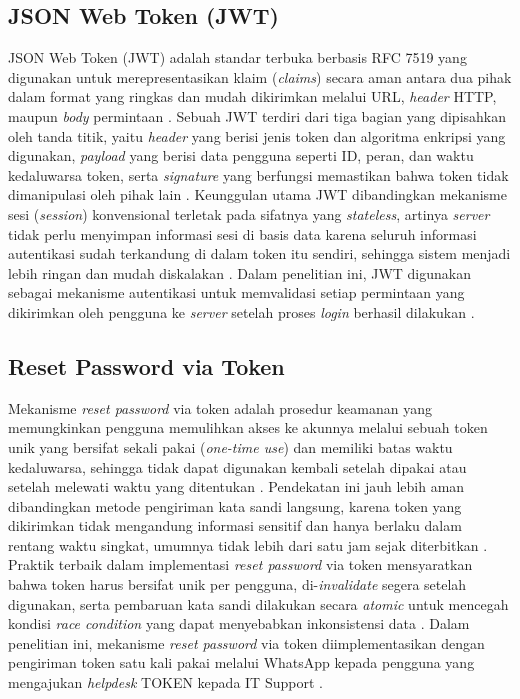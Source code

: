 \subsection{JSON Web Token (JWT)} \label{II.JWT}
JSON Web Token (JWT) adalah standar terbuka berbasis RFC 7519 yang digunakan untuk merepresentasikan klaim (\textit{claims}) secara aman antara dua pihak dalam format yang ringkas dan mudah dikirimkan melalui URL, \textit{header} HTTP, maupun \textit{body} permintaan \cite{jones2015rfc7519}. Sebuah JWT terdiri dari tiga bagian yang dipisahkan oleh tanda titik, yaitu \textit{header} yang berisi jenis token dan algoritma enkripsi yang digunakan, \textit{payload} yang berisi data pengguna seperti ID, peran, dan waktu kedaluwarsa token, serta \textit{signature} yang berfungsi memastikan bahwa token tidak dimanipulasi oleh pihak lain \cite{jones2015rfc7519}. Keunggulan utama JWT dibandingkan mekanisme sesi (\textit{session}) konvensional terletak pada sifatnya yang \textit{stateless}, artinya \textit{server} tidak perlu menyimpan informasi sesi di basis data karena seluruh informasi autentikasi sudah terkandung di dalam token itu sendiri, sehingga sistem menjadi lebih ringan dan mudah diskalakan \cite{miftahul2024jwt}. Dalam penelitian ini, JWT digunakan sebagai mekanisme autentikasi untuk memvalidasi setiap permintaan yang dikirimkan oleh pengguna ke \textit{server} setelah proses \textit{login} berhasil dilakukan \cite{miftahul2024jwt}. \par

\subsection{Reset Password via Token} \label{II.ResetPassword}
Mekanisme \textit{reset password} via token adalah prosedur keamanan yang memungkinkan pengguna memulihkan akses ke akunnya melalui sebuah token unik yang bersifat sekali pakai (\textit{one-time use}) dan memiliki batas waktu kedaluwarsa, sehingga tidak dapat digunakan kembali setelah dipakai atau setelah melewati waktu yang ditentukan \cite{vaadata2024reset}. Pendekatan ini jauh lebih aman dibandingkan metode pengiriman kata sandi langsung, karena token yang dikirimkan tidak mengandung informasi sensitif dan hanya berlaku dalam rentang waktu singkat, umumnya tidak lebih dari satu jam sejak diterbitkan \cite{vaadata2024reset}. Praktik terbaik dalam implementasi \textit{reset password} via token mensyaratkan bahwa token harus bersifat unik per pengguna, di-\textit{invalidate} segera setelah digunakan, serta pembaruan kata sandi dilakukan secara \textit{atomic} untuk mencegah kondisi \textit{race condition} yang dapat menyebabkan inkonsistensi data \cite{vaadata2024reset}. Dalam penelitian ini, mekanisme \textit{reset password} via token diimplementasikan dengan pengiriman token satu kali pakai melalui WhatsApp kepada pengguna yang mengajukan \textit{helpdesk} TOKEN kepada IT Support \cite{vaadata2024reset}. \par

